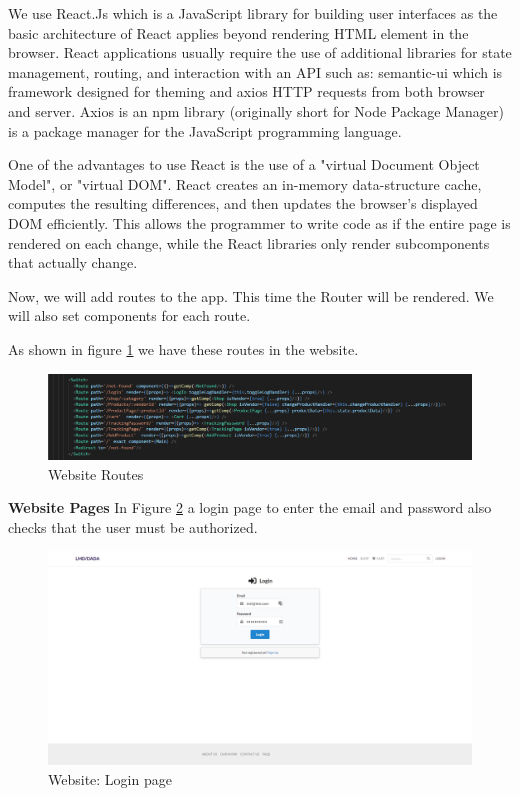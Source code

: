 We use React.Js which is a JavaScript library for building user interfaces as the basic architecture of React applies beyond rendering HTML element in the browser.
React applications usually require the use of additional libraries for state management, routing, and interaction with an API such as: semantic-ui which is framework designed for theming and axios HTTP requests from both browser and server. Axios is an npm library (originally short for Node Package Manager) is a package manager for the JavaScript programming language.

One of the advantages to use React is the use of a "virtual Document Object Model", or "virtual DOM". React creates an in-memory data-structure cache, computes the resulting differences, and then updates the browser's displayed DOM efficiently. This allows the programmer to write code as if the entire page is rendered on each change, while the React libraries only render subcomponents that actually change.

Now, we will add routes to the app. This time the Router will be rendered. We will also set components for each route.

As shown in figure \ref{fig: routes} we have these routes in the website.
\begin{figure}[htp]%
    \center%
    \includegraphics[width=1\textwidth]{images/Software/routes.PNG}%
    \caption[Website Routes]{Website Routes}\label{fig: routes}%
  \end{figure}

\textbf{Website Pages} 
In Figure \ref{fig: login} a login page to enter the email and password also checks that the user must be authorized.
\begin{figure}[htp]%
    \center%
    \includegraphics[width=1\textwidth]{images/Software/login.PNG}%
    \caption[Website: Login page]{Website: Login page}\label{fig: login}%
  \end{figure}

